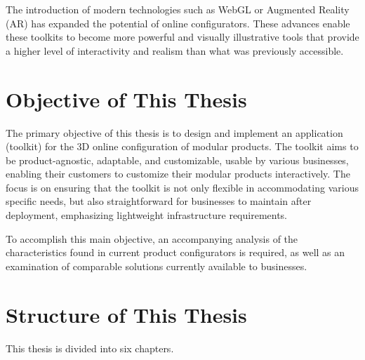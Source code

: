 The introduction of modern technologies such as WebGL or Augmented Reality (AR) has expanded the potential of online configurators. These advances enable these toolkits to become more powerful and visually illustrative tools that provide a higher level of interactivity and realism than what was previously accessible. \cite{Cozzi2015}

\section*{Objective of This Thesis}

The primary objective of this thesis is to design and implement an application (toolkit) for the 3D online configuration of modular products. The toolkit aims to be product-agnostic, adaptable, and customizable, usable by various businesses, enabling their customers to customize their modular products interactively. The focus is on ensuring that the toolkit is not only flexible in accommodating various specific needs, but also straightforward for businesses to maintain after deployment, emphasizing lightweight infrastructure requirements. 

To accomplish this main objective, an accompanying analysis of the characteristics found in current product configurators is required, as well as an examination of comparable solutions currently available to businesses.

\section*{Structure of This Thesis}

This thesis is divided into six chapters.

